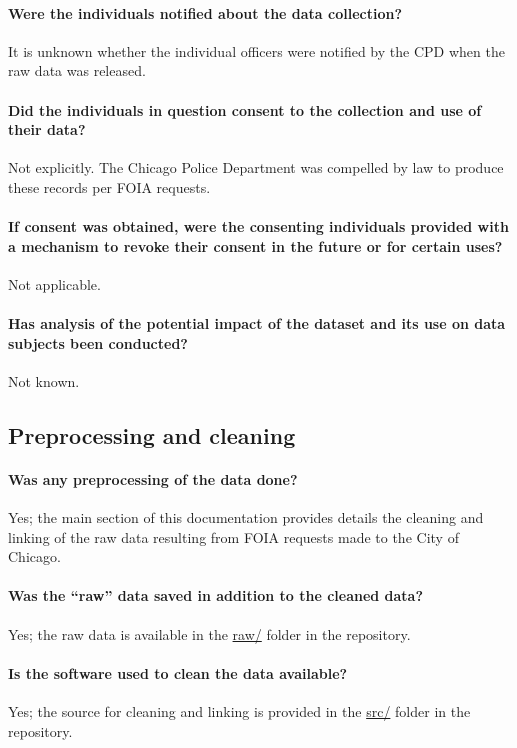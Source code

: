 \paragraph{Were the individuals notified about the data collection?}
It is unknown whether the individual officers were notified by the CPD when the raw data was released. 

\paragraph{Did the individuals in question consent to the collection and use of their data?}
Not explicitly. The Chicago Police Department was compelled by law to produce these records per FOIA requests.

\paragraph{If consent was obtained, were the consenting individuals provided with a mechanism to revoke their consent in the future or for certain uses?}
Not applicable.

\paragraph{Has analysis of the potential impact of the dataset and its use on data subjects been conducted?}
Not known.

\subsection{Preprocessing and cleaning}

\paragraph{Was any preprocessing of the data done?}
Yes; the main section of this documentation provides details the cleaning and linking of the raw
data resulting from FOIA requests made to the City of Chicago.

\paragraph{Was the ``raw'' data saved in addition to the cleaned data?}
Yes; the raw data is available in the \url{raw/} folder in the repository.

\paragraph{Is the software used to clean the data available?}
Yes; the source for cleaning and linking is provided in the \url{src/} folder in the repository.


